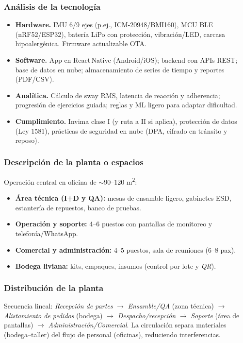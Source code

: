 \subsubsection{Análisis de la tecnología}
\begin{itemize}
    \item \textbf{Hardware.} IMU 6/9 ejes (p.ej., ICM-20948/BMI160), MCU BLE (nRF52/ESP32), batería LiPo con protección, vibración/LED, carcasa hipoalergénica. Firmware actualizable OTA. 
    \item \textbf{Software.} App en React\,Native (Android/iOS); backend con APIs REST; base de datos en nube; almacenamiento de series de tiempo y reportes (PDF/CSV). 
    \item \textbf{Analítica.} Cálculo de sway RMS, latencia de reacción y adherencia; progresión de ejercicios guiada; reglas y ML ligero para adaptar dificultad.
    \item \textbf{Cumplimiento.} Invima clase I (y ruta a II si aplica), protección de datos (Ley 1581), prácticas de seguridad en nube (DPA, cifrado en tránsito y reposo).
\end{itemize}

\subsubsection{Descripción de la planta o espacios}
Operación central en oficina de $\sim$90--120 m\textsuperscript{2}:
\begin{itemize}
    \item \textbf{Área técnica (I+D y QA):} mesas de ensamble ligero, gabinetes ESD, estantería de repuestos, banco de pruebas.
    \item \textbf{Operación y soporte:} 4--6 puestos con pantallas de monitoreo y telefonía/WhatsApp.
    \item \textbf{Comercial y administración:} 4--5 puestos, sala de reuniones (6--8 pax).
    \item \textbf{Bodega liviana:} kits, empaques, insumos (control por lote y \emph{QR}).
\end{itemize}

\subsubsection{Distribución de la planta}
Secuencia lineal: \emph{Recepción de partes} $\rightarrow$ \emph{Ensamble/QA} (zona técnica) $\rightarrow$ \emph{Alistamiento de pedidos} (bodega) $\rightarrow$ \emph{Despacho/recepción} $\rightarrow$ \emph{Soporte} (área de pantallas) $\rightarrow$ \emph{Administración/Comercial}. La circulación separa materiales (bodega--taller) del flujo de personal (oficinas), reduciendo interferencias.

